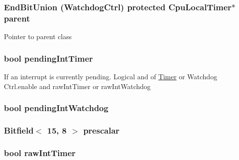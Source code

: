 \label{classCpuLocalTimer_1_1Timer_a7be8312de67b0bdb2313091b3ece8d63}
\hypertarget{classCpuLocalTimer_1_1Timer_a91fc2d2ffb2ff7ef97b6aed0a032ba23}{
\subsubsection[{parent}]{\setlength{\rightskip}{0pt plus 5cm}EndBitUnion (WatchdogCtrl) protected {\bf CpuLocalTimer}$\ast$ {\bf parent}}}
\label{classCpuLocalTimer_1_1Timer_a91fc2d2ffb2ff7ef97b6aed0a032ba23}
Pointer to parent class \hypertarget{classCpuLocalTimer_1_1Timer_a357b071730029e981be07c885c7ec91d}{
\subsubsection[{pendingIntTimer}]{\setlength{\rightskip}{0pt plus 5cm}bool {\bf pendingIntTimer}}}
\label{classCpuLocalTimer_1_1Timer_a357b071730029e981be07c885c7ec91d}
If an interrupt is currently pending. Logical and of \hyperlink{classCpuLocalTimer_1_1Timer}{Timer} or Watchdog Ctrl.enable and rawIntTimer or rawIntWatchdog \hypertarget{classCpuLocalTimer_1_1Timer_a663bde1c5f669163f0ca90a9042455f9}{
\subsubsection[{pendingIntWatchdog}]{\setlength{\rightskip}{0pt plus 5cm}bool {\bf pendingIntWatchdog}}}
\label{classCpuLocalTimer_1_1Timer_a663bde1c5f669163f0ca90a9042455f9}
\hypertarget{classCpuLocalTimer_1_1Timer_af8a4a2ed9062ccf29845771bd30398a4}{
\subsubsection[{prescalar}]{\setlength{\rightskip}{0pt plus 5cm}Bitfield$<$ 15, 8 $>$ {\bf prescalar}}}
\label{classCpuLocalTimer_1_1Timer_af8a4a2ed9062ccf29845771bd30398a4}
\hypertarget{classCpuLocalTimer_1_1Timer_acae15a5a0ab8900fb06f11e079cf6de2}{
\subsubsection[{rawIntTimer}]{\setlength{\rightskip}{0pt plus 5cm}bool {\bf rawIntTimer}}}
